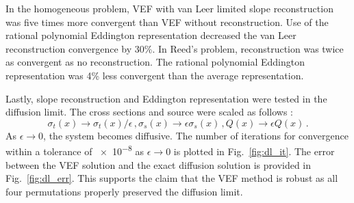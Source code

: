In the homogeneous problem, VEF with van Leer limited slope reconstruction was five times more convergent than VEF without reconstruction. Use of the rational polynomial Eddington representation decreased the van Leer reconstruction convergence by 30\%. 
 In Reed's problem, reconstruction was twice as convergent as no reconstruction. The rational polynomial Eddington representation was 4\% less convergent than the average representation. 

Lastly, slope reconstruction and Eddington representation were tested in the diffusion limit. The cross sections and source were scaled as follows \cite{diflim}: 
	\begin{subequations} \label{res:scaling}
		\begin{equation} 
			\sigma_t(x) \rightarrow \sigma_t(x)/\epsilon \,, 
		\end{equation}
		\begin{equation}
			\sigma_s(x) \rightarrow \epsilon \sigma_s(x) \,,
		\end{equation}
		\begin{equation}
			Q(x) \rightarrow \epsilon Q(x) \,. 
		\end{equation}
	\end{subequations}
As $\epsilon \rightarrow 0$, the system becomes diffusive. The number of iterations for convergence within a tolerance of \num{e-8} as $\epsilon \rightarrow 0$ is plotted in Fig.~\ref{fig:dl_it}. The error between the VEF solution and the exact diffusion solution is provided in Fig.~\ref{fig:dl_err}. This supports the claim that the VEF method is robust as all four permutations properly 
preserved the diffusion limit. 
	
